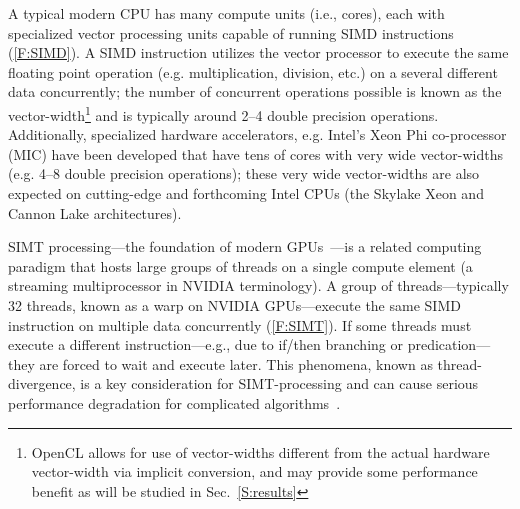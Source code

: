 \documentclass[12pt,number,sort&compress]{elsarticle}
\begin{document}
A typical modern CPU has many compute units (i.e., cores), each with specialized vector processing units capable of running SIMD instructions (\cref{F:SIMD}).
A SIMD instruction utilizes the vector processor to execute the same floating point operation (e.g. multiplication, division, etc.) on a several different data concurrently; the number of concurrent operations possible is known as the vector-width\footnote{OpenCL allows for use of vector-widths different from the actual hardware vector-width via implicit conversion, and may provide some performance benefit as will be studied in Sec.~\ref{S:results}} and is typically around 2--4 double precision operations. 
Additionally, specialized hardware accelerators, e.g. Intel's Xeon Phi co-processor (MIC) have been developed that have tens of cores with very wide vector-widths (e.g. 4--8 double precision operations); these very wide vector-widths are also expected on cutting-edge and forthcoming Intel CPUs (the Skylake Xeon and Cannon Lake architectures).

SIMT processing---the foundation of modern GPUs~\cite{lindholm2008nvidia}---is a related computing paradigm that hosts large groups of threads on a single compute element (a streaming multiprocessor in NVIDIA terminology).
A group of threads---typically \num{32} threads, known as a warp on NVIDIA GPUs---execute the same SIMD instruction on multiple data concurrently (\cref{F:SIMT}).
If some threads must execute a different instruction---e.g., due to if\slash then branching or predication---they are forced to wait and execute later.
This phenomena, known as thread-divergence, is a key consideration for SIMT-processing and can cause serious performance degradation for complicated algorithms~\cite{CurtisGPU:2017}.
\end{document}
